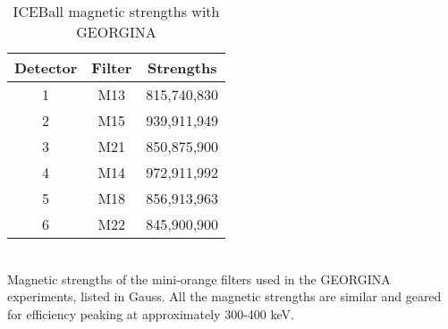 \begin{table}[]
    \centering
    \caption{ICEBall magnetic strengths with GEORGINA}
     \label{tab:ICE_Magnet_G}
    \begin{tabular}{c|c|c} \toprule
         Detector & Filter & Strengths \\
         \hline
         1 & M13 & 815,740,830 \\ 
         2 & M15 & 939,911,949\\
         3 & M21 & 850,875,900 \\
         4 & M14 & 972,911,992\\
         5 & M18 & 856,913,963\\
         6 & M22 & 845,900,900\\ \bottomrule
    \end{tabular}
    \\[2]
    \footnotesize
    Magnetic strengths of the mini-orange filters used in the GEORGINA experiments, listed in Gauss. All the magnetic strengths are similar and geared for efficiency peaking at approximately 300-400 keV.
\end{table}